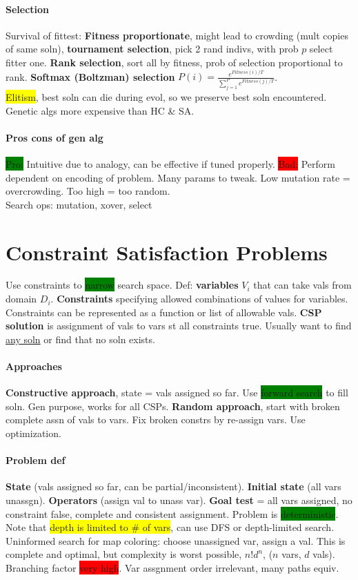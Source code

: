 \paragraph{Selection} Survival of fittest: \textbf{Fitness
  proportionate}, might lead to crowding (mult copies of same soln),
\textbf{tournament selection}, pick 2 rand indivs, with prob $p$
select fitter one. \textbf{Rank selection}, sort all by fitness, prob
of selection proportional to rank. \textbf{Softmax (Boltzman)
  selection}
$P(i)=\frac{e^{Fitness(i)/T}}{\sum_{j=1}^{P}e^{Fitness(j)/T}}$.
\\ \colorbox{yellow}{Elitism}, best soln can die during evol, so we
preserve best soln encountered. Genetic algs more expensive than HC \&
SA.
\paragraph{Pros cons of gen alg} \colorbox{green}{Pro:} Intuitive due to analogy, can be
effective if tuned properly. \colorbox{red}{Bad:} Perform dependent on
encoding of problem. Many params to tweak. Low mutation rate =
overcrowding. Too high = too random.
\\ Search ops: mutation, xover, select
\color[HTML]{A10F6F}
\section{Constraint Satisfaction Problems} Use constraints to
\colorbox{green}{narrow} search space. Def: \textbf{variables} $V_i$
that can take vals from domain $D_i$. \textbf{Constraints} specifying
allowed combinations of values for variables. Constraints can be
represented as a function or list of allowable vals. \textbf{CSP
  solution} is assignment of vals to vars st all constraints
true. Usually want to find \underline{any soln} or find that no soln
exists.
\paragraph{Approaches}
\textbf{Constructive approach}, state = vals assigned so far. Use
\colorbox{green}{forward search} to fill soln. Gen purpose, works for
all CSPs. \textbf{Random approach}, start with broken complete assn of
vals to vars. Fix broken constrs by re-assign vars. Use optimization.
\paragraph{Problem def}\textbf{State} (vals assigned so far, can be
partial/inconsistent). \textbf{Initial state} (all vars
unassgn). \textbf{Operators} (assign val to unass var). \textbf{Goal
  test} = all vars assigned, no constraint false, complete and
consistent assignment. Problem is
\colorbox{green}{deterministic}. Note that \colorbox{yellow}{depth is
  limited to \# of vars}, can use DFS or depth-limited search.
\\ Uninformed search for map coloring: choose unassigned var, assign a
val. This is complete and optimal, but complexity is worst possible,
$n! d^n$, ($n$ vars, $d$ vals). Branching factor \colorbox{red}{very
  high}. Var assgnment order irrelevant, many paths equiv.
